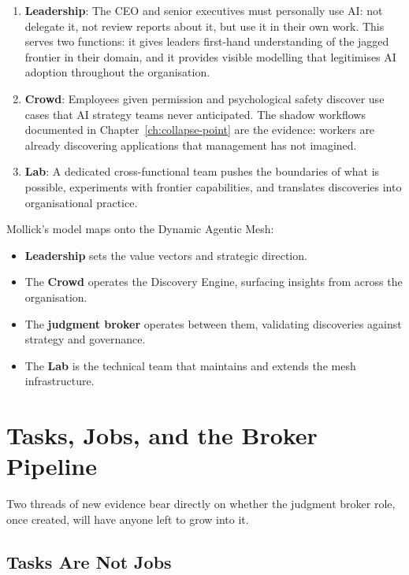 \begin{enumerate}
  \item \textbf{Leadership}: The CEO and senior executives must personally use AI: not delegate it, not review reports about it, but use it in their own work. This serves two functions: it gives leaders first-hand understanding of the jagged frontier in their domain, and it provides visible modelling that legitimises AI adoption throughout the organisation.
  \item \textbf{Crowd}: Employees given permission and psychological safety discover use cases that AI strategy teams never anticipated. The shadow workflows documented in Chapter~\ref{ch:collapse-point} are the evidence: workers are already discovering applications that management has not imagined.
  \item \textbf{Lab}: A dedicated cross-functional team pushes the boundaries of what is possible, experiments with frontier capabilities, and translates discoveries into organisational practice.
\end{enumerate}

\begin{keyinsight}
Mollick's model maps onto the Dynamic Agentic Mesh:
\begin{itemize}
  \item \textbf{Leadership} sets the value vectors and strategic direction.
  \item The \textbf{Crowd} operates the Discovery Engine, surfacing insights from across the organisation.
  \item The \textbf{judgment broker} operates between them, validating discoveries against strategy and governance.
  \item The \textbf{Lab} is the technical team that maintains and extends the mesh infrastructure.
\end{itemize}
\end{keyinsight}

\section{Tasks, Jobs, and the Broker Pipeline}

Two threads of new evidence bear directly on whether the judgment broker role, once created, will have anyone left to grow into it.

\subsection{Tasks Are Not Jobs}

